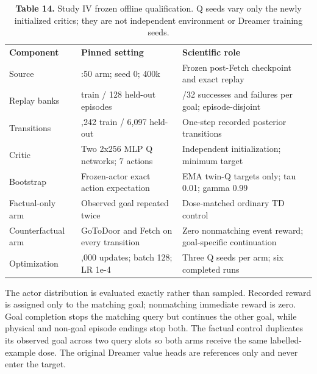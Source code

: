 \documentclass[10pt,a4paper]{article}
\begin{document}
\begin{table}[H]
\centering
\begingroup
\footnotesize
\setlength{\tabcolsep}{3.5pt}
\renewcommand{\arraystretch}{1.15}
\begin{tabularx}{\textwidth}{@{} >{\hsize=0.632\hsize\RaggedRight\arraybackslash}X >{\hsize=1.111\hsize\RaggedRight\arraybackslash}X >{\hsize=1.257\hsize\RaggedRight\arraybackslash}X @{}}
\rowcolor{brandblue}
\color{white}\textbf{Component} & \color{white}\textbf{Pinned setting} & \color{white}\textbf{Scientific role} \\
Source & 50:50 arm; seed 0; 400k & Frozen post-Fetch checkpoint and exact replay \\
\rowcolor{rowgray}
Replay banks & 256 train / 128 held-out episodes & 64/32 successes and failures per goal; episode-disjoint \\
Transitions & 12,242 train / 6,097 held-out & One-step recorded posterior transitions \\
\rowcolor{rowgray}
Critic & Two 2x256 MLP Q networks; 7 actions & Independent initialization; minimum target \\
Bootstrap & Frozen-actor exact action expectation & EMA twin-Q targets only; tau 0.01; gamma 0.99 \\
\rowcolor{rowgray}
Factual-only arm & Observed goal repeated twice & Dose-matched ordinary TD control \\
Counterfactual arm & GoToDoor and Fetch on every transition & Zero nonmatching event reward; goal-specific continuation \\
\rowcolor{rowgray}
Optimization & 10,000 updates; batch 128; LR 1e-4 & Three Q seeds per arm; six completed runs \\
\bottomrule
\end{tabularx}
\endgroup
\caption*{\textbf{Table 14.} Study IV frozen offline qualification. Q seeds vary only the newly initialized critics; they are not independent environment or Dreamer training seeds.}
\end{table}
\begin{center}
\end{center}
The actor distribution is evaluated exactly rather than sampled. Recorded reward is assigned only to the matching goal; nonmatching immediate reward is zero. Goal completion stops the matching query but continues the other goal, while physical and non-goal episode endings stop both. The factual control duplicates its observed goal across two query slots so both arms receive the same labelled-example dose. The original Dreamer value heads are references only and never enter the target.
\end{document}
